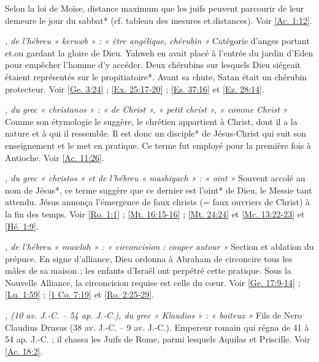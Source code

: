 \begin{multicols}{2}
\textit{}\newline
Selon la loi de Moïse, distance maximum que les juifs peuvent parcourir de leur demeure le jour du sabbat* (cf. tableau des mesures et.distances). Voir \vref{Ac. 1:12}.

\textit{, de l'hébreu « keruwb » : « être angélique, chérubin »}\newline
Catégorie d'anges portant et.ou gardant la gloire de Dieu. Yahweh en avait placé à l'entrée du jardin d'Eden pour empêcher l'homme d'y accéder. Deux chérubins sur lesquels Dieu siégeait étaient représentés sur le propitiatoire*. Avant sa chute, Satan était un chérubin protecteur. Voir \vref{Ge. 3:24} ; \vref{Ex. 25:17-20} ; \vref{Es. 37:16} et \vref{Ez. 28:14}.

\textit{, du grec « christanos » : « de Christ », « petit christ », « comme Christ »}\newline
Comme son étymologie le suggère, le chrétien appartient à Christ, dont il a la nature et à qui il ressemble. Il est donc un disciple* de Jésus-Christ qui suit son enseignement et le met en pratique. Ce terme fut employé pour la première fois à Antioche. Voir \vref{Ac. 11:26}.

\textit{, du grec « christos » et de l'hébreu « mashiyach » : « oint »}\newline
Souvent accolé au nom de Jésus*, ce terme suggère que ce dernier est l'oint* de Dieu, le Messie tant attendu. Jésus annonça l'émergence de faux christs (= faux ouvriers de Christ) à la fin des temps. Voir \vref{Ro. 1:1} ; \vref{Mt. 16:15-16} ; \vref{Mt. 24:24} et \vref{Mc. 13:22-23} et \vref{Hé. 1:9}.

\textit{, de l'hébreu « muwlah » : « circoncision : couper autour »}\newline
Section et ablation du prépuce. En signe d'alliance, Dieu ordonna à Abraham de circoncire tous les mâles de sa maison ; les enfants d'Israël ont perpétré cette pratique. Sous la Nouvelle Alliance, la circoncision requise est celle du cœur. Voir \vref{Ge. 17:9-14} ; \vref{Lu. 1:59} ; \vref{1 Co. 7:19} et \vref{Ro. 2:25-29}.

\textit{, (10 av. J.-C. – 54 ap. J.-C.), du grec « Klaudios » : « boiteux »}\newline
Fils de Nero Claudius Drusus (38 av. J.-C. – 9 av. J.-C.). Empereur romain qui régna de 41 à 54 ap. J.-C. ; il chassa les Juifs de Rome, parmi lesquels Aquilas et Priscille. Voir \vref{Ac. 18:2}.


\end{multicols}
